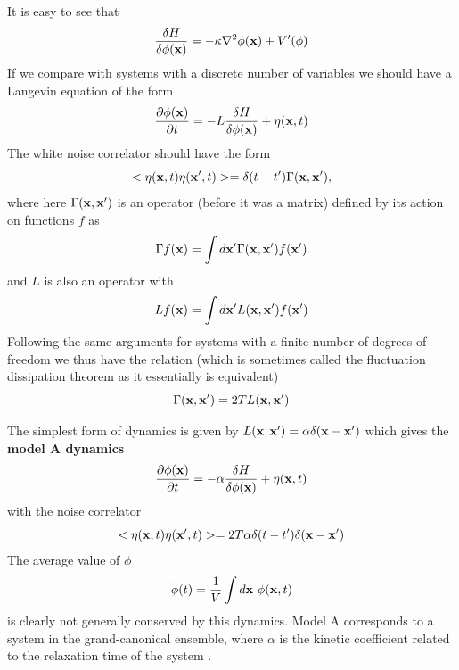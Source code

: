 It is easy to see that 
\begin{equation}
    \frac{\delta H}{\delta \phi({\bf x})} = -\kappa \nabla^2 \phi({\bf x}) + V'(\phi)
    \label{cm}
\end{equation}
If we compare with systems with a discrete number of variables we
should have a Langevin equation of the form
\begin{equation}
    \frac{\partial \phi({\bf x})}{\partial t}= -L \frac{\delta H}{\delta \phi({\bf x})} + \eta({\bf x},t)
\end{equation}
The white noise correlator should have the form
\begin{equation}
    < \eta({\bf x},t)\eta({\bf x}',t)> =\delta(t-t')\Gamma({\bf x},{\bf x'}),
\end{equation}
where here  $\Gamma({\bf x},{\bf x'})$ is an operator (before it was a matrix) defined by its action on functions $f$ as
\begin{equation}
    \Gamma f({\bf x}) = \int d{\bf x}' \Gamma({\bf x},{\bf x}')f({\bf x}')
\end{equation}
and $L$ is also an operator with 
\begin{equation}
    L f({\bf x}) = \int d{\bf x}' L({\bf x},{\bf x}')f({\bf x}')
\end{equation}
Following the same arguments for systems with a finite number of degrees of freedom we thus have the relation (which is sometimes called the fluctuation dissipation theorem as it essentially is equivalent)
\begin{equation} 
    \Gamma({\bf x},{\bf x}') =2T L({\bf x},{\bf x}')
    \label{gnoise}
\end{equation}

The simplest form of dynamics is given by $L({\bf x},{\bf x}')=\alpha\delta({\bf x}-{\bf x}')$ which gives the \textbf{model A dynamics}
\begin{equation}
    \frac{\partial \phi({\bf x})}{\partial t}= -\alpha \frac{\delta H}{\delta \phi({\bf x})} + \eta({\bf x},t)   
    \label{MA}
\end{equation}
with the noise correlator
\begin{equation}
    < \eta({\bf x},t)\eta({\bf x}',t)> =2T \alpha \delta(t-t')\delta({\bf x}-{\bf x'})
\end{equation}
The average value of $\phi$ 
\begin{equation}
    \overline \phi(t) = \frac{1}{V}\int d{\bf x}\  \phi({\bf x},t)
\end{equation}
is clearly not generally conserved by this dynamics. {\color{purple} Model A corresponds to a system in the grand-canonical ensemble, where $\alpha$ is the kinetic coefficient related to the relaxation time of the system \cite{hohenberg_theory_1977}.}

